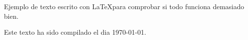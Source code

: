 \documentclass{article}
\begin{document}
 Ejemplo de texto
 escrito con \LaTeX para comprobar si todo funciona demasiado bien.

 Este texto ha sido compilado el dia \today.

 
\end{document}
